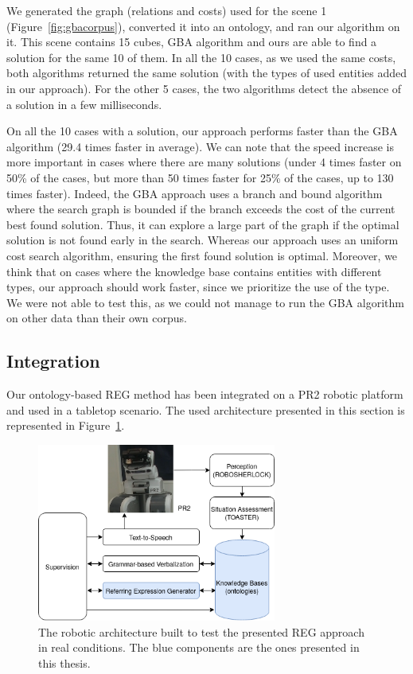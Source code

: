 \documentclass[a4paper,11pt,twoside]{StyleThese}
\begin{document}
We generated the graph (relations and costs) used for the scene 1 (Figure~\ref{fig:gbacorpus}), converted it into an ontology, and ran our algorithm on it.
This scene contains 15 cubes, GBA algorithm and ours are able to find a solution for the same 10 of them. In all the 10 cases, as we used the same costs, both algorithms returned the same solution (with the types of used entities added in our approach). 
For the other 5 cases, the two algorithms detect the absence of a solution in a few milliseconds.

On all the 10 cases with a solution, our approach performs faster than the GBA algorithm (29.4 times faster in average). We can note that the speed increase is more important in cases where there are many solutions (under 4 times faster on 50\% of the cases, but more than 50 times faster for 25\% of the cases, up to 130 times faster). 
Indeed, the GBA approach uses a branch and bound algorithm where the search graph is bounded if the branch exceeds the cost of the current best found solution. Thus, it can explore a large part of the graph if the optimal solution is not found early in the search. Whereas our approach uses an uniform cost search algorithm, ensuring the first found solution is optimal.
Moreover, we think that on cases where the knowledge base contains entities with different types, our approach should work faster, since we prioritize the use of the type. We were not able to test this, as we could not manage to run the GBA algorithm on other data than their own corpus.

\subsection{Integration}

Our ontology-based REG method has been integrated on a PR2 robotic platform and used in a tabletop scenario. The used architecture presented in this section is represented in Figure~\ref{fig:regarchi}.

\begin{figure}[hbtp]
\centering
\includegraphics[width=0.7\textwidth]{figures/chapter3/ArchiREG.png}
\caption{The robotic architecture built to test the presented REG approach in real conditions. The blue components are the ones presented in this thesis.}
\label{fig:regarchi}
\end{figure}
\end{document}

